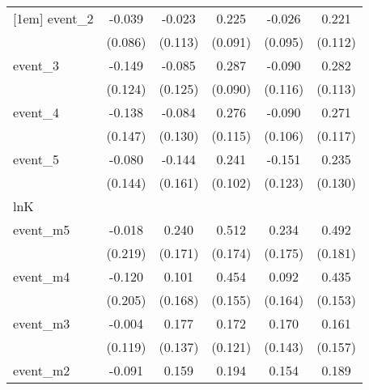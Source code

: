 {\begin{tabular}{l*{5}{c}}
[1em]
event\_2     &      -0.039         &      -0.023         &       0.225\sym{*}  &      -0.026         &       0.221\sym{*}  \\
            &     (0.086)         &     (0.113)         &     (0.091)         &     (0.095)         &     (0.112)         \\
[1em]
event\_3     &      -0.149         &      -0.085         &       0.287\sym{**} &      -0.090         &       0.282\sym{*}  \\
            &     (0.124)         &     (0.125)         &     (0.090)         &     (0.116)         &     (0.113)         \\
[1em]
event\_4     &      -0.138         &      -0.084         &       0.276\sym{*}  &      -0.090         &       0.271\sym{*}  \\
            &     (0.147)         &     (0.130)         &     (0.115)         &     (0.106)         &     (0.117)         \\
[1em]
event\_5     &      -0.080         &      -0.144         &       0.241\sym{*}  &      -0.151         &       0.235         \\
            &     (0.144)         &     (0.161)         &     (0.102)         &     (0.123)         &     (0.130)         \\
\hline
lnK         &                     &                     &                     &                     &                     \\
event\_m5    &      -0.018         &       0.240         &       0.512\sym{**} &       0.234         &       0.492\sym{**} \\
            &     (0.219)         &     (0.171)         &     (0.174)         &     (0.175)         &     (0.181)         \\
[1em]
event\_m4    &      -0.120         &       0.101         &       0.454\sym{**} &       0.092         &       0.435\sym{**} \\
            &     (0.205)         &     (0.168)         &     (0.155)         &     (0.164)         &     (0.153)         \\
[1em]
event\_m3    &      -0.004         &       0.177         &       0.172         &       0.170         &       0.161         \\
            &     (0.119)         &     (0.137)         &     (0.121)         &     (0.143)         &     (0.157)         \\
[1em]
event\_m2    &      -0.091         &       0.159         &       0.194\sym{*}  &       0.154         &       0.189         \\

\end{tabular}}
